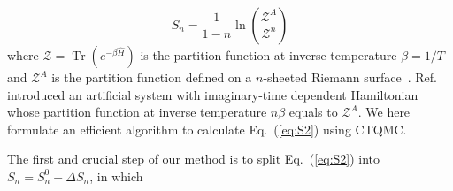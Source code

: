 \documentclass[twocolumn,english,prl,showpacs]{revtex4}
\DeclareMathOperator{\Tr}{Tr}
\begin{document}
\begin{equation}
S_{n} = \frac{1}{1-n}\ln\left(\frac{\mathcal{Z}^{A}}{\mathcal{Z}^{n}}\right)
\label{eq:S2}
\end{equation}
where $\mathcal{Z}= \Tr(e^{-\beta \hat{H}})$ is the partition 
function at inverse temperature $\beta=1/T$ and $\mathcal{Z}^{A}$ is the partition function defined on a $n$-sheeted Riemann surface~\cite{Melko:2010jda}. Ref.\cite{Broecker:2014ud} introduced an artificial system with imaginary-time dependent Hamiltonian whose partition function at inverse temperature $n\beta$ equals to $\mathcal{Z}^{A}$. We here formulate an efficient algorithm to calculate Eq.~({\ref{eq:S2}}) using CTQMC. 



The first and crucial step of our method is to split Eq.~(\ref{eq:S2}) into  $S_{n} = S_{n}^{0} + \Delta S_{n}$, in which 
\end{document}
